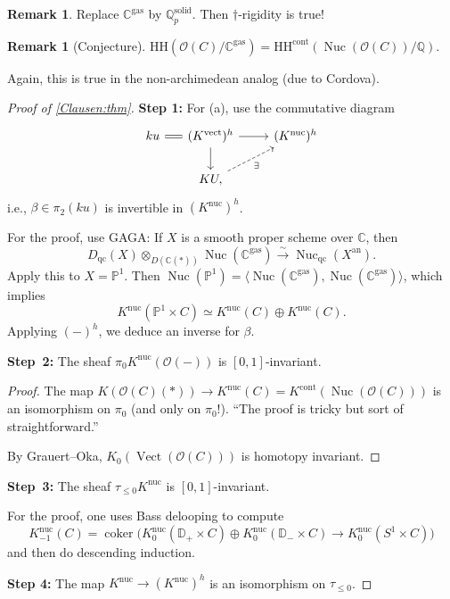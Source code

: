 \documentclass[draft]{amsart}
\newcommand{\QQ}{\mathbb{Q}}
\newcommand{\DD}{\mathbb{D}}
\newcommand{\CC}{\mathbb{C}}
\newcommand{\PP}{\mathbb{P}}
\renewcommand{\O}{\mathcal{O}}
\newcommand{\isoto}{\mathbin{\xrightarrow{\sim}}}
\newcommand{\blank}{-} %
\DeclareMathOperator{\coker}{coker}
\DeclareMathOperator{\Nuc}{Nuc}
\DeclareMathOperator{\Vect}{Vect}
\theoremstyle{definition}
\newtheorem{rem}[thm]{Remark}
\begin{document}
\begin{rem}
Replace $\CC^{\mathrm{gas}}$ by $\QQ_p^{\mathrm{solid}}$. Then $\dagger$-rigidity is true!
\end{rem}

\begin{rem}[Conjecture]
$\mathrm{HH}(\O(C)/\CC^{\mathrm{gas}}) = \mathrm{HH}^{\mathrm{cont}}(\Nuc(\O(C))/\QQ)$.

Again, this is true in the non-archimedean analog (due to Cordova).
\end{rem}

\begin{proof}[Proof of \cref{Clausen:thm}]
\textbf{Step 1:} For (a), use the commutative diagram
\[
\begin{tikzcd}
ku \ar[r,equals] &[-1em]  (K^{\mathrm{vect}})^h \ar[d] \ar[r] & (K^{\mathrm{nuc}})^h \\
& KU \ar[ur,dashed, "\exists"'],
\end{tikzcd}
\]
i.e., $\beta\in \pi_2(ku)$ is invertible in $(K^{\mathrm{nuc}})^h$.

For the proof, use GAGA: If $X$ is a smooth proper scheme over $\CC$, then
\[
D_{\mathrm{qc}}(X) \otimes_{D(\CC(*))} \Nuc(\CC^{\mathrm{gas}}) \isoto \Nuc_{\mathrm{qc}}(X^{\mathrm{an}}).
\]
Apply this to $X = \PP^1$. Then $\Nuc(\PP^1) = \langle \Nuc(\CC^{\mathrm{gas}}), \Nuc(\CC^{\mathrm{gas}})\rangle$, which implies
\[
K^{\mathrm{nuc}}(\PP^1\times C) \simeq K^{\mathrm{nuc}}(C) \oplus K^{\mathrm{nuc}}(C).
\]
Applying $(\blank)^h$, we deduce an inverse for $\beta$.
\medskip

\textbf{Step~2:} The sheaf $\pi_0 K^{\mathrm{nuc}}(\O(\blank))$ is $[0,1]$-invariant.
\begin{proof}
The map $K(\O(C)(*)) \to K^{\mathrm{nuc}}(C) = K^{\mathrm{cont}}(\Nuc(\O(C)))$ is an isomorphism on $\pi_0$ (and only on $\pi_0$!). \enquote{The proof is tricky but sort of straightforward.}

By Grauert--Oka, $K_0(\Vect(\O(C)))$ is homotopy invariant.
\end{proof}

\textbf{Step~3:} The sheaf $\tau_{\le 0}K^{\mathrm{nuc}}$ is $[0,1]$-invariant.

For the proof, one uses Bass delooping to compute 
\[
K^{\mathrm{nuc}}_{-1}(C) = \coker\bigl(K_0^{\mathrm{nuc}}(\DD_+\times C) \oplus K_0^{\mathrm{nuc}}(\DD_-\times C) \to K_0^{\mathrm{nuc}}(S^1\times C) \bigr)
\]
and then do descending induction.
\medskip

\textbf{Step 4:} The map $K^{\mathrm{nuc}} \to (K^{\mathrm{nuc}})^h$ is an isomorphism on $\tau_{\le0}$.


\end{proof}
\end{document}
